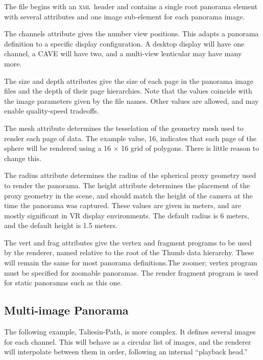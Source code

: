 \documentclass[article,twocolumn,10pt]{memoir}
\newcommand{\xml}     {\textsc{xml}}
\begin{document}
\begin{Spacing}{1.1}
The file begins with an \xml\ header and contains a single root panorama element with several attributes and one image sub-element for each panorama image.

The channels attribute gives the number view positions. This adapts a panorama definition to a specific display configuration. A desktop display will have one channel, a CAVE will have two, and a multi-view lenticular may have many more.

The size and depth attributes give the size of each page in the panorama image files and the depth of their page hierarchies. Note that the values coincide with the image parameters given by the file names. Other values are allowed, and may enable quality-speed tradeoffs.

The mesh attribute determines the tesselation of the geometry mesh used to render each page of data. The example value, 16, indicates that each page of the sphere will be rendered using a 16 × 16 grid of polygons. There is little reason to change this.

The radius attribute determines the radius of the spherical proxy geometry used to render the panorama. The height attribute determines the placement of the proxy geometry in the scene, and should match the height of the camera at the time the panorama was captured. These values are given in meters, and are mostly significant in VR display environments. The default radius is 6 meters, and the default height is 1.5 meters.

The vert and frag attributes give the vertex and fragment programs to be used by the renderer, named relative to the root of the Thumb data hierarchy. These will remain the same for most panorama definitions.The zoomer; vertex program must be specified for zoomable panoramas. The render fragment program is used for static panoramas such as this one.

\subsection{Multi-image Panorama}

The following example, Taliesin-Path, is more complex. It defines several images for each channel. This will behave as a circular list of images, and the renderer will interpolate between them in order, following an internal “playback head.”


\end{Spacing}
\end{document}
